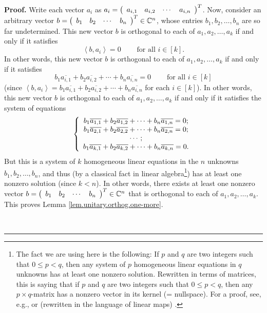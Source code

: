 \documentclass[numbers=enddot,12pt,final,onecolumn,notitlepage]{scrartcl}%
\numberwithin{exer}{subsection}
\theoremstyle{definition}
\newenvironment{proof}[1][Proof]{\noindent\textbf{#1.} }{\ \rule{0.5em}{0.5em}}
\begin{document}
\begin{proof}
Write each vector $a_{i}$ as $a_{i}=\left(
\begin{array}
[c]{cccc}%
a_{i,1} & a_{i,2} & \cdots & a_{i,n}%
\end{array}
\right)  ^{T}$. Now, consider an arbitrary vector $b=\left(
\begin{array}
[c]{cccc}%
b_{1} & b_{2} & \cdots & b_{n}%
\end{array}
\right)  ^{T}\in\mathbb{C}^{n}$, whose entries $b_{1},b_{2},\ldots,b_{n}$ are
so far undetermined. This new vector $b$ is orthogonal to each of $a_{1}%
,a_{2},\ldots,a_{k}$ if and only if it satisfies%
\[
\left\langle b,a_{i}\right\rangle =0\ \ \ \ \ \ \ \ \ \ \text{for all }%
i\in\left[  k\right]  .
\]
In other words, this new vector $b$ is orthogonal to each of $a_{1}%
,a_{2},\ldots,a_{k}$ if and only if it satisfies%
\[
b_{1}\overline{a_{i,1}}+b_{2}\overline{a_{i,2}}+\cdots+b_{n}\overline{a_{i,n}%
}=0\ \ \ \ \ \ \ \ \ \ \text{for all }i\in\left[  k\right]
\]
(since $\left\langle b,a_{i}\right\rangle =b_{1}\overline{a_{i,1}}%
+b_{2}\overline{a_{i,2}}+\cdots+b_{n}\overline{a_{i,n}}$ for each $i\in\left[
k\right]  $). In other words, this new vector $b$ is orthogonal to each of
$a_{1},a_{2},\ldots,a_{k}$ if and only if it satisfies the system of equations%
\[
\left\{
\begin{array}
[c]{c}%
b_{1}\overline{a_{1,1}}+b_{2}\overline{a_{1,2}}+\cdots+b_{n}\overline{a_{1,n}%
}=0;\\
b_{1}\overline{a_{2,1}}+b_{2}\overline{a_{2,2}}+\cdots+b_{n}\overline{a_{2,n}%
}=0;\\
\cdots;\\
b_{1}\overline{a_{k,1}}+b_{2}\overline{a_{k,2}}+\cdots+b_{n}\overline{a_{k,n}%
}=0.
\end{array}
\right.
\]
But this is a system of $k$ homogeneous linear equations in the $n$ unknowns
$b_{1},b_{2},\ldots,b_{n}$, and thus (by a classical fact in linear
algebra\footnote{The fact we are using here is the following: If $p$ and $q$
are two integers such that $0\leq p<q$, then any system of $p$ homogeneous
linear equations in $q$ unknowns has at least one nonzero solution. Rewritten
in terms of matrices, this is saying that if $p$ and $q$ are two integers such
that $0\leq p<q$, then any $p\times q$-matrix has a nonzero vector in its
kernel (= nullspace). For a proof, see, e.g., \cite[Remark 8.9]{Strick20} or
(rewritten in the language of linear maps) \cite[Corollary 6.5.3 item
1]{LaNaSc16}.}) has at least one nonzero solution (since $k<n$). In other
words, there exists at least one nonzero vector $b=\left(
\begin{array}
[c]{cccc}%
b_{1} & b_{2} & \cdots & b_{n}%
\end{array}
\right)  ^{T}\in\mathbb{C}^{n}$ that is orthogonal to each of $a_{1}%
,a_{2},\ldots,a_{k}$. This proves Lemma \ref{lem.unitary.orthog.one-more}.
\medskip


\end{proof}
\end{document}
